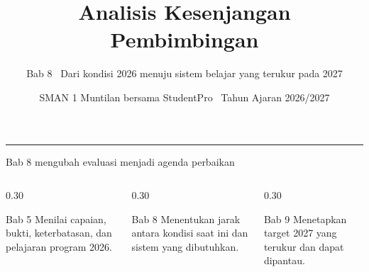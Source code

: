 \renewcommand{\currentchapter}{8}
\title{Analisis Kesenjangan Pembimbingan}
\subtitle{Bab 8 \textbar\ Dari kondisi 2026 menuju sistem belajar yang terukur pada 2027}
\date{SMAN 1 Muntilan bersama StudentPro \textbar\ Tahun Ajaran 2026/2027}

\begingroup
{}
\begin{frame}[plain]
  \vspace{0.65cm}
  \vspace{0.08cm}
  {\color{StudentWhite}\inserttitle\par}
  \vspace{0.38cm}
  {\color{StudentSoft}\insertsubtitle\par}
  \vfill
  {\color{StudentGold}\rule{2.3cm}{2.5pt}}\par
  \vspace{0.20cm}
  {\color{StudentWhite}\insertauthor}\par
  {\color{StudentSoft}\insertdate}
  \vspace{0.42cm}
\end{frame}
\endgroup

\begin{frame}{Bab 8 mengubah evaluasi menjadi agenda perbaikan}
  \begin{columns}[T,onlytextwidth]
    \begin{column}{0.30\textwidth}
      \begin{block}{Bab 5}
        Menilai capaian, bukti, keterbatasan, dan pelajaran program 2026.
      \end{block}
    \end{column}
    \begin{column}{0.30\textwidth}
      \begin{block}{Bab 8}
        Menentukan jarak antara kondisi saat ini dan sistem yang dibutuhkan.
      \end{block}
    \end{column}
    \begin{column}{0.30\textwidth}
      \begin{block}{Bab 9}
        Menetapkan target 2027 yang terukur dan dapat dipantau.
      \end{block}
    \end{column}
  \end{columns}
  \vspace{0.26cm}
\end{frame}

